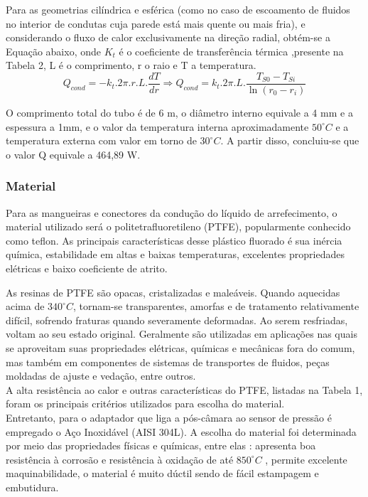 Para as geometrias cilíndrica e esférica (como no caso de escoamento de fluidos no interior de condutas cuja parede está mais quente ou mais fria), e considerando o fluxo de calor exclusivamente na direção radial, obtém-se a Equação abaixo, onde $K_{t}$ é o coeficiente de transferência térmica ,presente na Tabela 2, L é o comprimento, r o raio e T a temperatura.
$$ Q_{cond} = -k_{t}.2\pi.r.L.\frac{dT}{dr} \Longrightarrow Q_{cond} = k_{t}.2\pi.L.\frac{T_{S0}-T_{Si}}{\ln (r_{0}-r_{i})}$$

O comprimento total do tubo é de 6 m, o diâmetro interno equivale a 4 mm e a espessura a 1mm, e o valor da temperatura interna aproximadamente $50^{\circ}C$ e a temperatura externa com valor em torno de $30^{\circ}C$. A partir disso, concluiu-se que o valor Q equivale a 464,89 W.

\subsubsection{Material}
Para as mangueiras e conectores da condução do líquido de arrefecimento, o material utilizado será o politetrafluoretileno (PTFE), popularmente conhecido como teflon. As principais características desse plástico fluorado é sua inércia química, estabilidade em altas e baixas temperaturas, excelentes propriedades elétricas e baixo coeficiente de atrito.

As resinas de PTFE são opacas, cristalizadas e maleáveis. Quando aquecidas acima de $340^{\circ}C$, tornam-se transparentes, amorfas e de tratamento relativamente difícil, sofrendo fraturas quando severamente deformadas. Ao serem resfriadas, voltam ao seu estado original. Geralmente são utilizadas em aplicações nas quais se aproveitam suas propriedades elétricas, químicas e mecânicas fora do comum, mas também em componentes de sistemas de transportes de fluidos, peças moldadas de ajuste e vedação, entre outros.\\

A alta resistência ao calor e outras características do PTFE, listadas na Tabela 1, foram os principais critérios utilizados para escolha do material.\\



Entretanto, para o adaptador que liga a pós-câmara ao sensor de pressão é empregado o Aço Inoxidável (AISI 304L). A escolha do material foi determinada por meio das propriedades físicas e químicas, entre elas : apresenta boa resistência à corrosão e resistência à oxidação de até $850^{\circ}C$ , permite excelente maquinabilidade, o material é muito dúctil sendo de fácil estampagem e  embutidura.

